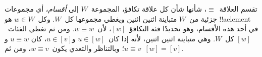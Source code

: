 \documentclass[../../../include/open-logic-section]{subfiles}
\begin{document}
تقسم العلاقة~$\equiv$، شأنها شأن كل علاقة تكافؤ، المجموعة~$W$ إلى
\emph{أقسام}، أي مجموعات جزئية من~$W$ متباينة اثنين اثنين ويغطي مجموعها
كل~$W$. وكل~$w \in W$ هو !!a{element} في أحد هذه الأقسام، وهو تحديدًا
فئة التكافؤ~$[w]$، لأن~$w \equiv w$. ومن ثم تغطي الفئات~$[w]$ كل~$W$.
وهي متباينة اثنين اثنين، لأنه إذا كان~$u \in [w]$ و$u \in [v]$، كان
$u \equiv w$ و$u \equiv v$؛ وبالتناظر والتعدي يكون~$w \equiv v$، ومن
ثم~$[w]=[v]$.
\end{document}
